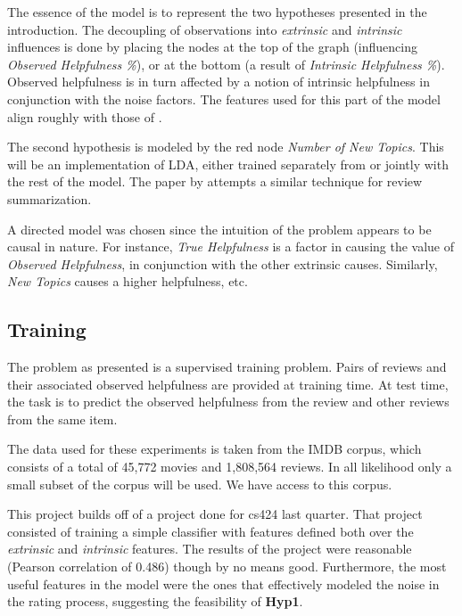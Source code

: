 \documentclass[letter,12pt]{article}
\begin{document}
The essence of the model is to represent the two hypotheses presented in the
	introduction. 
The decoupling of observations into {\em extrinsic} and
	{\em intrinsic} influences is done by placing the nodes at the top
	of the graph (influencing {\em Observed Helpfulness \%}), or at the bottom
	(a result of {\em Intrinsic Helpfulness \%}).
Observed helpfulness is in turn affected by a notion of intrinsic helpfulness
	in conjunction with the noise factors.
The features used for this part of the model align roughly with those of
	.

The second hypothesis is modeled by the red node {\em Number of New Topics}.
This will be an implementation of LDA, either trained separately from or
	jointly with the rest of the model.
The paper by  attempts a similar technique
	for review summarization.

A directed model was chosen since the intuition of the problem appears to
	be causal in nature.
For instance, {\em True Helpfulness} is a factor in causing the value of
	{\em Observed Helpfulness}, in conjunction with the other extrinsic
	causes.
Similarly, {\em New Topics} causes a higher helpfulness, etc.

\subsection{Training}
The problem as presented is a supervised training problem.
Pairs of reviews and their associated observed helpfulness are provided at
	training time.
At test time, the task is to predict the observed helpfulness from the review
	and other reviews from the same item.

The data used for these experiments is taken from the IMDB corpus, which
	consists of a total of 45,772 movies and 1,808,564 reviews.
In all likelihood only a small subset of the corpus will be used.
We have access to this corpus.


This project builds off of a project done for cs424 last quarter.
That project consisted of training a simple classifier with features
	defined both over the {\em extrinsic} and {\em intrinsic} features.
The results of the project were reasonable (Pearson correlation of 0.486)
	though by no means good.
Furthermore, the most useful features in the model were the ones that
	effectively modeled the noise in the rating process, suggesting the
	feasibility of {\bf Hyp1}.
\end{document}
